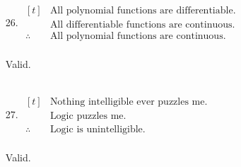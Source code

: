 \documentclass[letterpaper,fleqn]{article}
\begin{document}
\begin{enumerate}
\begin{enumerate}[]
\begin{enumerate}
				\item [26.]
				$\begin{aligned}[t]
					& \text{All polynomial functions are differentiable.} \\
					& \text{All differentiable functions are continuous.} \\
					\therefore{} & \text{All polynomial functions are continuous.} 
				\end{aligned}$ \\\\
				Valid. \\
				 \\
				
				\item [27.]
				$\begin{aligned}[t]
					& \text{Nothing intelligible ever puzzles me.} \\
					& \text{Logic puzzles me.} \\
					\therefore{} & \text{Logic is unintelligible.} 
				\end{aligned}$ \\\\
				Valid. \\
				 \\
			\end{enumerate}
		\end{enumerate}
	\end{enumerate}
\end{document}
